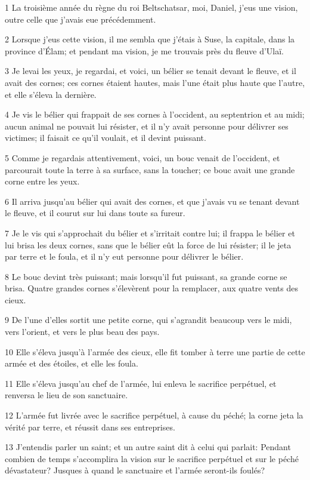 \par 1 La troisième année du règne du roi Beltschatsar, moi, Daniel, j'eus une vision, outre celle que j'avais eue précédemment.
\par 2 Lorsque j'eus cette vision, il me sembla que j'étais à Suse, la capitale, dans la province d'Élam; et pendant ma vision, je me trouvais près du fleuve d'Ulaï.
\par 3 Je levai les yeux, je regardai, et voici, un bélier se tenait devant le fleuve, et il avait des cornes; ces cornes étaient hautes, mais l'une était plus haute que l'autre, et elle s'éleva la dernière.
\par 4 Je vis le bélier qui frappait de ses cornes à l'occident, au septentrion et au midi; aucun animal ne pouvait lui résister, et il n'y avait personne pour délivrer ses victimes; il faisait ce qu'il voulait, et il devint puissant.
\par 5 Comme je regardais attentivement, voici, un bouc venait de l'occident, et parcourait toute la terre à sa surface, sans la toucher; ce bouc avait une grande corne entre les yeux.
\par 6 Il arriva jusqu'au bélier qui avait des cornes, et que j'avais vu se tenant devant le fleuve, et il courut sur lui dans toute sa fureur.
\par 7 Je le vis qui s'approchait du bélier et s'irritait contre lui; il frappa le bélier et lui brisa les deux cornes, sans que le bélier eût la force de lui résister; il le jeta par terre et le foula, et il n'y eut personne pour délivrer le bélier.
\par 8 Le bouc devint très puissant; mais lorsqu'il fut puissant, sa grande corne se brisa. Quatre grandes cornes s'élevèrent pour la remplacer, aux quatre vents des cieux.
\par 9 De l'une d'elles sortit une petite corne, qui s'agrandit beaucoup vers le midi, vers l'orient, et vers le plus beau des pays.
\par 10 Elle s'éleva jusqu'à l'armée des cieux, elle fit tomber à terre une partie de cette armée et des étoiles, et elle les foula.
\par 11 Elle s'éleva jusqu'au chef de l'armée, lui enleva le sacrifice perpétuel, et renversa le lieu de son sanctuaire.
\par 12 L'armée fut livrée avec le sacrifice perpétuel, à cause du péché; la corne jeta la vérité par terre, et réussit dans ses entreprises.
\par 13 J'entendis parler un saint; et un autre saint dit à celui qui parlait: Pendant combien de temps s'accomplira la vision sur le sacrifice perpétuel et sur le péché dévastateur? Jusques à quand le sanctuaire et l'armée seront-ils foulés?
